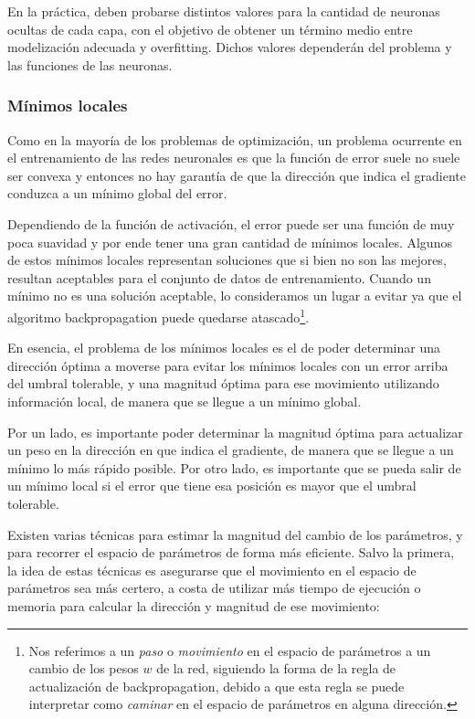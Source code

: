 En la práctica, deben probarse distintos valores para la cantidad de neuronas ocultas de cada capa, con el objetivo de obtener un término medio entre modelización adecuada y overfitting. Dichos valores dependerán del problema y las funciones de las neuronas.
 
\subsubsection{Mínimos locales}

Como en la mayoría de los problemas de optimización, un problema ocurrente en el entrenamiento de las redes neuronales es que la función de error suele no suele ser convexa y entonces no hay garantía de que la dirección que indica el gradiente conduzca a un mínimo global del error.

Dependiendo de la función de activación, el error puede ser una función de muy poca suavidad y por ende tener una gran cantidad de mínimos locales. Algunos de estos mínimos locales representan soluciones que si bien no son las mejores, resultan aceptables para el conjunto de datos de entrenamiento. Cuando un mínimo no es una solución aceptable, lo consideramos un lugar a evitar ya que el algoritmo backpropagation puede quedarse atascado\footnote{Nos referimos a un \textit{paso} o \textit{movimiento} en el espacio de parámetros a un cambio de los pesos $w$ de la red, siguiendo la forma de la regla de actualización de backpropagation, debido a que esta regla se puede interpretar como \textit{caminar} en el espacio de parámetros en alguna dirección.}. 

En esencia, el problema de los mínimos locales es el de poder determinar una dirección óptima a moverse para evitar los mínimos locales con un error arriba del umbral tolerable, y una magnitud óptima para ese movimiento utilizando información local, de manera que se llegue a un mínimo global. 

Por un lado, es importante poder determinar la magnitud óptima para actualizar un peso en la dirección en que indica el gradiente, de manera que se llegue a un mínimo lo más rápido posible. Por otro lado, es importante que se pueda salir de un mínimo local si el error que tiene esa posición es mayor que el umbral tolerable. 

Existen varias técnicas para estimar la magnitud del cambio de los parámetros, y para recorrer el espacio de parámetros de forma más eficiente. Salvo la primera, la idea de estas técnicas es asegurarse que el movimiento en el espacio de parámetros sea más certero, a costa de utilizar más tiempo de ejecución o memoria para calcular la dirección y magnitud de ese movimiento:

